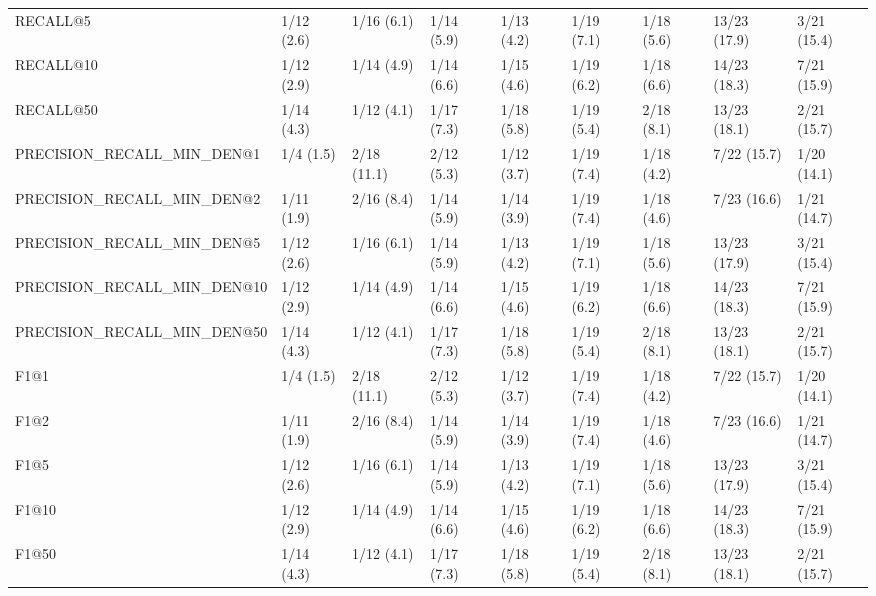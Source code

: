 \begin{tabular}{lllllllll}
RECALL@5                    &     1/12 (2.6) &     1/16 (6.1) &    1/14 (5.9) &    1/13 (4.2) &  1/19 (7.1) &   1/18 (5.6) &   13/23 (17.9) &        3/21 (15.4) \\
RECALL@10                   &     1/12 (2.9) &     1/14 (4.9) &    1/14 (6.6) &    1/15 (4.6) &  1/19 (6.2) &   1/18 (6.6) &   14/23 (18.3) &        7/21 (15.9) \\
RECALL@50                   &     1/14 (4.3) &     1/12 (4.1) &    1/17 (7.3) &    1/18 (5.8) &  1/19 (5.4) &   2/18 (8.1) &   13/23 (18.1) &        2/21 (15.7) \\
PRECISION_RECALL_MIN_DEN@1  &      1/4 (1.5) &    2/18 (11.1) &    2/12 (5.3) &    1/12 (3.7) &  1/19 (7.4) &   1/18 (4.2) &    7/22 (15.7) &        1/20 (14.1) \\
PRECISION_RECALL_MIN_DEN@2  &     1/11 (1.9) &     2/16 (8.4) &    1/14 (5.9) &    1/14 (3.9) &  1/19 (7.4) &   1/18 (4.6) &    7/23 (16.6) &        1/21 (14.7) \\
PRECISION_RECALL_MIN_DEN@5  &     1/12 (2.6) &     1/16 (6.1) &    1/14 (5.9) &    1/13 (4.2) &  1/19 (7.1) &   1/18 (5.6) &   13/23 (17.9) &        3/21 (15.4) \\
PRECISION_RECALL_MIN_DEN@10 &     1/12 (2.9) &     1/14 (4.9) &    1/14 (6.6) &    1/15 (4.6) &  1/19 (6.2) &   1/18 (6.6) &   14/23 (18.3) &        7/21 (15.9) \\
PRECISION_RECALL_MIN_DEN@50 &     1/14 (4.3) &     1/12 (4.1) &    1/17 (7.3) &    1/18 (5.8) &  1/19 (5.4) &   2/18 (8.1) &   13/23 (18.1) &        2/21 (15.7) \\
F1@1                        &      1/4 (1.5) &    2/18 (11.1) &    2/12 (5.3) &    1/12 (3.7) &  1/19 (7.4) &   1/18 (4.2) &    7/22 (15.7) &        1/20 (14.1) \\
F1@2                        &     1/11 (1.9) &     2/16 (8.4) &    1/14 (5.9) &    1/14 (3.9) &  1/19 (7.4) &   1/18 (4.6) &    7/23 (16.6) &        1/21 (14.7) \\
F1@5                        &     1/12 (2.6) &     1/16 (6.1) &    1/14 (5.9) &    1/13 (4.2) &  1/19 (7.1) &   1/18 (5.6) &   13/23 (17.9) &        3/21 (15.4) \\
F1@10                       &     1/12 (2.9) &     1/14 (4.9) &    1/14 (6.6) &    1/15 (4.6) &  1/19 (6.2) &   1/18 (6.6) &   14/23 (18.3) &        7/21 (15.9) \\
F1@50                       &     1/14 (4.3) &     1/12 (4.1) &    1/17 (7.3) &    1/18 (5.8) &  1/19 (5.4) &   2/18 (8.1) &   13/23 (18.1) &        2/21 (15.7) \\

\end{tabular}
